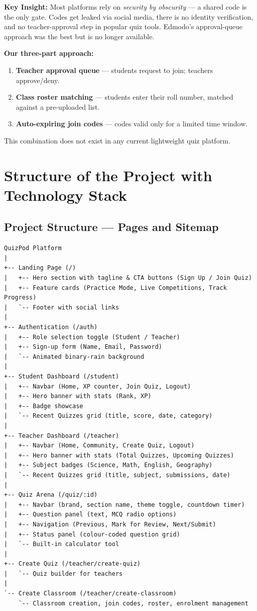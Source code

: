 \documentclass[12pt,a4paper]{article}
\begin{document}
\textbf{Key Insight:} Most platforms rely on \emph{security by obscurity} --- a
shared code is the only gate. Codes get leaked via social media, there is no
identity verification, and no teacher-approval step in popular quiz tools.
Edmodo's approval-queue approach was the best but is no longer available.

\textbf{Our three-part approach:}
\begin{enumerate}[leftmargin=1.5em]
  \item \textbf{Teacher approval queue} --- students request to join; teachers approve/deny.
  \item \textbf{Class roster matching} --- students enter their roll number, matched against a pre-uploaded list.
  \item \textbf{Auto-expiring join codes} --- codes valid only for a limited time window.
\end{enumerate}

\begin{infobox}
  This combination does not exist in any current lightweight quiz platform.
\end{infobox}

\section{Structure of the Project with Technology Stack}

\subsection{Project Structure --- Pages and Sitemap}

\begin{lstlisting}
QuizPod Platform
|
+-- Landing Page (/)
|   +-- Hero section with tagline & CTA buttons (Sign Up / Join Quiz)
|   +-- Feature cards (Practice Mode, Live Competitions, Track Progress)
|   `-- Footer with social links
|
+-- Authentication (/auth)
|   +-- Role selection toggle (Student / Teacher)
|   +-- Sign-up form (Name, Email, Password)
|   `-- Animated binary-rain background
|
+-- Student Dashboard (/student)
|   +-- Navbar (Home, XP counter, Join Quiz, Logout)
|   +-- Hero banner with stats (Rank, XP)
|   +-- Badge showcase
|   `-- Recent Quizzes grid (title, score, date, category)
|
+-- Teacher Dashboard (/teacher)
|   +-- Navbar (Home, Community, Create Quiz, Logout)
|   +-- Hero banner with stats (Total Quizzes, Upcoming Quizzes)
|   +-- Subject badges (Science, Math, English, Geography)
|   `-- Recent Quizzes grid (title, subject, submissions, date)
|
+-- Quiz Arena (/quiz/:id)
|   +-- Navbar (brand, section name, theme toggle, countdown timer)
|   +-- Question panel (text, MCQ radio options)
|   +-- Navigation (Previous, Mark for Review, Next/Submit)
|   +-- Status panel (colour-coded question grid)
|   `-- Built-in calculator tool
|
+-- Create Quiz (/teacher/create-quiz)
|   `-- Quiz builder for teachers
|
`-- Create Classroom (/teacher/create-classroom)
    `-- Classroom creation, join codes, roster, enrolment management
\end{lstlisting}
\end{document}
